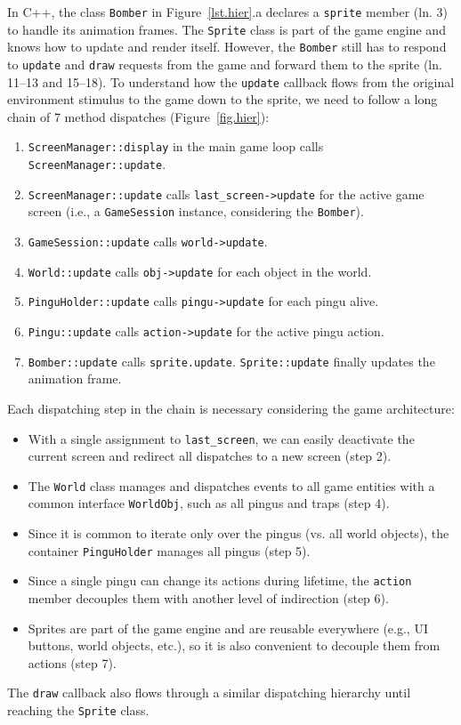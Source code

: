 \documentclass{vgtc}                          %
\newcommand{\code}[1] {{\small{\texttt{#1}}}}
\begin{document}
In C++, the class \code{Bomber} in Figure~\ref{lst.hier}.a declares a
\code{sprite} member (ln. 3) to handle its animation frames.
%
The \code{Sprite} class is part of the game engine and knows how to update and
render itself.
However, the \code{Bomber} still has to respond to \code{update} and
\code{draw} requests from the game and forward them to the sprite
(ln. 11--13 and 15--18).
%
To understand how the \code{update} callback flows from the original
environment stimulus to the game down to the sprite, we need to follow a long
chain of 7 method dispatches (Figure~\ref{fig.hier}):
%
\begin{enumerate}
\item \code{ScreenManager::display} in the main game loop calls
      \code{ScreenManager::update}.
\item \code{ScreenManager::update} calls \code{last\_screen->update} for the
      active game screen (i.e., a \code{GameSession} instance, considering the
      \code{Bomber}).
\item \code{GameSession::update} calls \code{world->update}.
\item \code{World::update} calls \code{obj->update} for each object in the
      world.
\item \code{PinguHolder::update} calls \code{pingu->update} for each pingu
      alive.
\item \code{Pingu::update} calls \code{action->update} for the active pingu
      action.
\item \code{Bomber::update} calls \code{sprite.update}.
      \code{Sprite::update} finally updates the animation frame.
\end{enumerate}
%
Each dispatching step in the chain is necessary considering the game
architecture:
%
\begin{itemize}
\item With a single assignment to \code{last\_screen}, we can easily deactivate
      the current screen and redirect all dispatches to a new screen (step 2).
\item The \code{World} class manages and dispatches events to all game
      entities with a common interface \code{WorldObj}, such as all pingus and
      traps (step 4).
\item Since it is common to iterate only over the pingus (vs. all world
      objects), the container \code{PinguHolder} manages all pingus (step 5).
\item Since a single pingu can change its actions during lifetime, the
      \code{action} member decouples them with another level of indirection
      (step 6).
\item Sprites are part of the game engine and are reusable everywhere (e.g., UI
      buttons, world objects, etc.), so it is also convenient to decouple them
      from actions (step 7).
\end{itemize}
%
The \code{draw} callback also flows through a similar dispatching hierarchy
until reaching the \code{Sprite} class.
\end{document}
